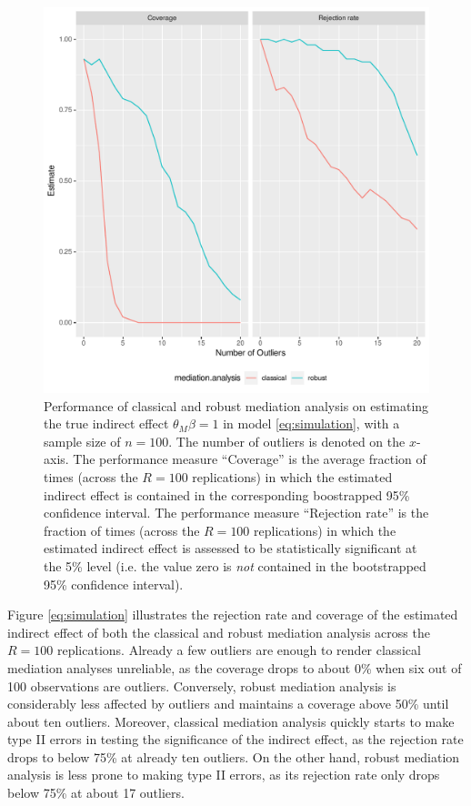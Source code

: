 \documentclass[12pt]{article}
\begin{document}
\begin{figure}
    \centering
    \includegraphics[width = \textwidth]{plot.pdf}
    \caption{Performance of classical and robust mediation analysis on estimating the true indirect effect $\theta_M \beta=1$ in model \eqref{eq:simulation}, with a sample size of $n=100$. The number of outliers is denoted on the $x$-axis. The performance measure ``Coverage'' is the average fraction of times (across the $R=100$ replications) in which the estimated indirect effect is contained in the corresponding boostrapped 95\% confidence interval. The performance measure ``Rejection rate'' is the fraction of times (across the $R=100$ replications) in which the estimated indirect effect is assessed to be statistically significant at the 5\% level (i.e. the value zero is \textit{not} contained in the bootstrapped 95\%  confidence interval).}
    \label{fig:results}
\end{figure}

Figure \ref{eq:simulation} illustrates the rejection rate and coverage of the estimated indirect effect of both the classical and robust mediation analysis across the $R=100$ replications. Already a few outliers are enough to render classical mediation analyses unreliable, as the coverage drops to about 0\% when six out of 100 observations are outliers. Conversely, robust mediation analysis is considerably less affected by outliers and maintains a coverage above 50\% until about ten outliers. Moreover, classical mediation analysis quickly starts to make type II errors in testing the significance of the indirect effect, as the rejection rate drops to below 75\% at already ten outliers. On the other hand, robust mediation analysis is less prone to making type II errors, as its rejection rate only drops below 75\% at about 17 outliers. 
\end{document}

